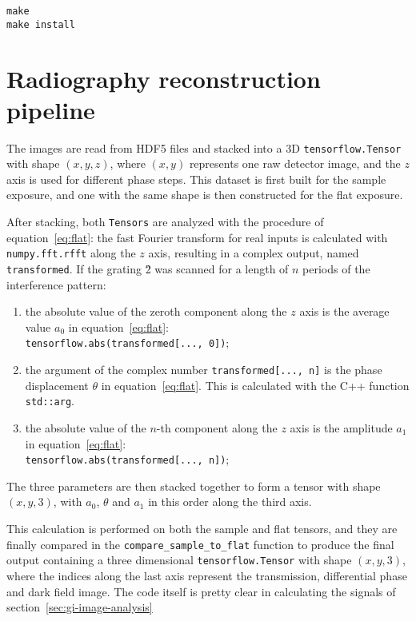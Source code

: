 \begin{lstlisting}
make
make install
\end{lstlisting}

\section{Radiography reconstruction pipeline}
The images are read from HDF5 files and stacked into a 3D
\texttt{tensorflow.Tensor} with shape $(x, y, z)$, where $(x, y)$
represents one raw detector image, and the $z$ axis is used for different
phase steps. This dataset is first built for the sample exposure, and one
with the same shape is then constructed for the flat exposure.

After stacking, both \texttt{Tensors} are analyzed with the procedure of
equation~\eqref{eq:flat}: the fast Fourier transform for real inputs is
calculated with \texttt{numpy.fft.rfft} along the $z$ axis, resulting in a
complex output, named \texttt{transformed}. If the grating \G2 was scanned
for a length of $n$ periods of the interference pattern:

\begin{enumerate}
    \item the absolute value of the zeroth component along the $z$ axis is the average value $a_0$
        in equation~\eqref{eq:flat}:\\
        \texttt{tensorflow.abs(transformed[..., 0])};
    \item the argument of the complex number \texttt{transformed[..., n]}
        is the phase displacement $\theta$ in equation~\eqref{eq:flat}. This
        is calculated with the C++ function \texttt{std::arg}.
    \item the absolute value of the $n$-th component along the $z$ axis is
        the amplitude $a_1$
        in equation~\eqref{eq:flat}:\\
        \texttt{tensorflow.abs(transformed[..., n])};
\end{enumerate}
The three parameters are then stacked together to form a tensor with shape
$(x, y, 3)$, with $a_0$, $\theta$ and $a_1$ in this order along the third axis.

This calculation is performed on both the sample and flat tensors, and they
are finally compared in the \texttt{compare\_sample\_to\_flat} function to
produce the final output containing a three dimensional
\texttt{tensorflow.Tensor} with shape $(x, y, 3)$, where the indices along
the last axis represent the transmission, differential phase and dark field
image. The code itself is pretty clear in calculating the signals of
section~\ref{sec:gi-image-analysis}

